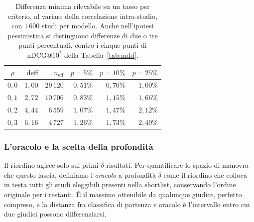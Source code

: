 \documentclass[pdflatex,sn-mathphys-num]{sn-jnl}
\theoremstyle{thmstyleone}
\theoremstyle{thmstyletwo}
\theoremstyle{thmstylethree}
\begin{document}
\begin{table}[H]
\centering
\begin{tabular}{crrrrr}
\toprule
$\rho$ & $\mathrm{deff}$ & $n_{\text{eff}}$ & $p = 5\%$ & $p = 10\%$ & $p = 25\%$ \\
\midrule
$0{,}0$ & $1{,}00$ & $29\,120$ & $0{,}51\%$ & $0{,}70\%$ & $1{,}00\%$ \\
$0{,}1$ & $2{,}72$ & $10\,706$ & $0{,}83\%$ & $1{,}15\%$ & $1{,}66\%$ \\
$0{,}2$ & $4{,}44$ & $6\,559$  & $1{,}07\%$ & $1{,}47\%$ & $2{,}12\%$ \\
$0{,}3$ & $6{,}16$ & $4\,727$  & $1{,}26\%$ & $1{,}73\%$ & $2{,}49\%$ \\
\bottomrule
\end{tabular}
\caption{Differenza minima rilevabile su un tasso per criterio, al variare della correlazione intra-studio, con $1\,600$ studi per modello. Anche nell'ipotesi pessimistica si distinguono differenze di due o tre punti percentuali, contro i cinque punti di $\mathrm{nDCG@}10^{*}$ della Tabella~\ref{tab:mdd}.}
\label{tab:potenza-criteri}
\end{table}

\subsubsection{L'oracolo e la scelta della profondità}\label{sec:profondita}

Il riordino agisce solo sui primi $\delta$ risultati. Per quantificare lo spazio di manovra che questo lascia, definiamo l'\emph{oracolo} a profondità $\delta$ come il riordino che colloca in testa tutti gli studi eleggibili presenti nella shortlist, conservando l'ordine originale per i restanti. È il massimo ottenibile da qualunque giudice, perfetto compreso, e la distanza fra classifica di partenza e oracolo è l'intervallo entro cui due giudici possono differenziarsi.
\end{document}
